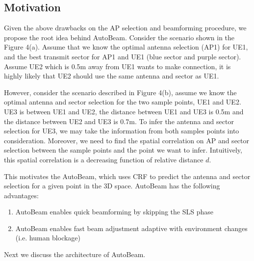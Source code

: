 \documentclass[conference]{IEEEtran}
\begin{document}
\subsection{Motivation}
Given the above drawbacks on the AP selection and beamforming procedure, we propose the root idea behind AutoBeam. Consider the scenario shown in the Figure 4(a). Assume that we know the optimal antenna selection (AP1) for UE1, and the best transmit sector for AP1 and UE1 (blue sector and purple sector). Assume UE2 which is 0.5m away from UE1 wants to make connection, it is highly likely that UE2 should use the same antenna and sector as UE1. 

However, consider the scenario described in Figure 4(b), assume we know the optimal antenna and sector selection for the two sample points, UE1 and UE2. UE3 is between UE1 and UE2, the distance between UE1 and UE3 is 0.5m and the distance between UE2 and UE3 is 0.7m. To infer the antenna and sector selection for UE3, we may take the information from both samples points into consideration. Moreover, we need to find the spatial correlation on AP and sector selection between the sample points and the point we want to infer. Intuitively, this spatial correlation is a decreasing function of relative distance $d$. 

This motivates the AutoBeam, which uses CRF to predict the antenna and sector selection for a given point in the 3D space. AutoBeam has the following advantages: 
\begin{enumerate}
	\item AutoBeam enables quick beamforming by skipping the SLS phase
	\item AutoBeam enables fast beam adjustment adaptive with environment changes (i.e. human blockage)
\end{enumerate}
Next we discuss the architecture of AutoBeam.
\end{document}
